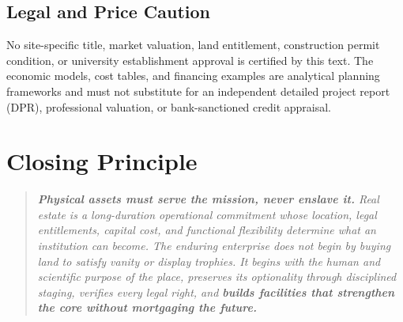 \subsection*{Legal and Price Caution}

No site-specific title, market valuation, land entitlement, construction permit condition, or university establishment approval is certified by this text. The economic models, cost tables, and financing examples are analytical planning frameworks and must not substitute for an independent detailed project report (DPR), professional valuation, or bank-sanctioned credit appraisal.

\section*{Closing Principle}

\begin{quote}
\itshape
\textbf{Physical assets must serve the mission, never enslave it.} Real estate is a long-duration operational commitment whose location, legal entitlements, capital cost, and functional flexibility determine what an institution can become. The enduring enterprise does not begin by buying land to satisfy vanity or display trophies. It begins with the human and scientific purpose of the place, preserves its optionality through disciplined staging, verifies every legal right, and \textbf{builds facilities that strengthen the core without mortgaging the future.}
\end{quote}

